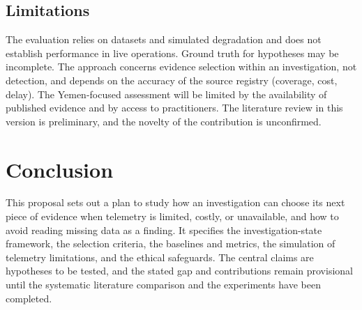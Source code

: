 \documentclass[a4paper,11pt,oneside]{article}
\begin{document}
\subsection{Limitations}
The evaluation relies on datasets and simulated degradation and does not establish performance in live operations. Ground truth for hypotheses may be incomplete. The approach concerns evidence selection within an investigation, not detection, and depends on the accuracy of the source registry (coverage, cost, delay). The Yemen-focused assessment will be limited by the availability of published evidence and by access to practitioners. The literature review in this version is preliminary, and the novelty of the contribution is unconfirmed.
\section{Conclusion}
This proposal sets out a plan to study how an investigation can choose its next piece of evidence when telemetry is limited, costly, or unavailable, and how to avoid reading missing data as a finding. It specifies the investigation-state framework, the selection criteria, the baselines and metrics, the simulation of telemetry limitations, and the ethical safeguards. The central claims are hypotheses to be tested, and the stated gap and contributions remain provisional until the systematic literature comparison and the experiments have been completed.
\clearpage
\end{document}
